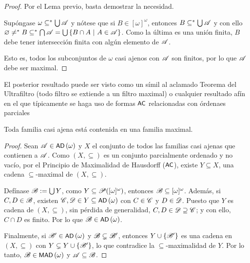 	\begin{proof}
		Por el Lema previo, basta demostrar la necesidad.
		
		Supóngase $\omega \subseteq^* \mbox{$\bigcup$}\, \mathscr{A}$ y nótese que si $B \in [\omega]^\omega$, entonces $B \subseteq^*\mbox{$\bigcup$}\, \mathscr{A}$ y con ello $\varnothing \neq^* B  \subseteq^* \mbox{$\bigcap$}\, \mathscr{A} = \mbox{$\bigcup$}\,\{B \cap A \text{ $|$ } A \in \mathscr{A}\}$. Como la última es una unión finita, $B$ debe tener intersección finita con algún elemento de $\mathscr{A}$.
		
		Esto es, todos los subconjuntos de $\omega$ casi ajenos con $\mathscr{A}$ son finitos, por lo que $\mathscr{A}$ debe ser maximal. 
	\end{proof}

	El posterior resultado puede ser visto como un símil al aclamado Teorema del Ultrafiltro (todo filtro se extiende a un filtro maximal) o cualquier resultado afín en el que típicamente se haga uso de formas $\text{\textsf{\small AC}}$ relacionadas con órdenaes parciales
	
	\begin{lema}\label{lem-MADs}
		Toda familia casi ajena está contenida en una familia maximal.
	\end{lema}
	
	\begin{proof}
		Sean $\mathscr{A} \in \operatorname{\text{\textsf{\small AD}}}\,(\omega)$ y $X$ el conjunto de todos las familias casi ajenas que contienen a $\mathscr{A}$. Como $(X,\subseteq)$ es un conjunto parcialmente ordenado y no vacío, por el Principio de Maximalidad de Hausdorff ($\text{\textsf{\small AC}}$), existe $Y \subseteq X$, una cadena $\subseteq$-maximal de $(X,\subseteq)$.
	
		Defínase $\mathscr{B}:=\mbox{$\bigcup$}\, Y$, como $Y \subseteq \mathscr{P}([\omega]^\omega)$, entonces $\mathscr{B} \subseteq [\omega]^{\omega}$. Además, si $C,D \in \mathscr{B}$, existen $\mathscr{C},\mathscr{D} \in Y \subseteq \operatorname{\text{\textsf{\small AD}}}\,(\omega)$ con $C \in \mathscr{C}$ y $D\in \mathscr{D}$. Puesto que $Y$ es cadena de $(X,\subseteq)$, sin pérdida de generalidad, $C,D \in \mathscr{D} \supseteq \mathscr{C}$; y con ello, $C \cap D$ es finito. Por lo que $\mathscr{B} \in \operatorname{\text{\textsf{\small AD}}}\,(\omega)$.
		
		Finalmente, si $\mathscr{B}' \in \operatorname{\text{\textsf{\small AD}}}\,(\omega)$ y $\mathscr{B} \subsetneq \mathscr{B}'$, entonces $Y \cup \{\mathscr{B}'\}$ es una cadena en $(X,\subseteq)$ con $Y \subsetneq Y\cup\{\mathscr{B}'\}$, lo que contradice la $\subseteq$-maximalidad de $Y$. Por lo tanto, $\mathscr{B}\in \operatorname{\text{\textsf{\small MAD}}}\,(\omega)$ y $\mathscr{A} \subseteq \mathscr{B}$.
	\end{proof}
	
	
